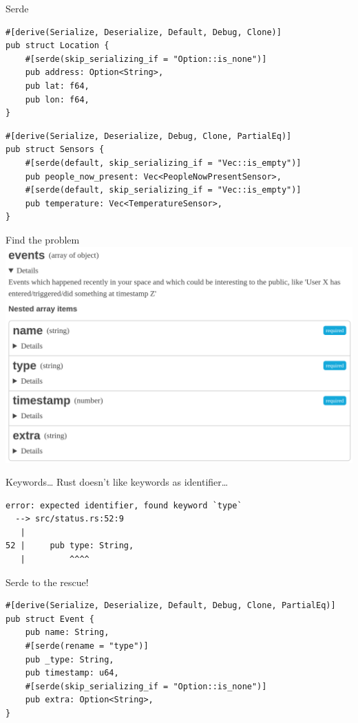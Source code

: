 \begin{frame}[fragile]{Serde}
    \begin{verbatim}
#[derive(Serialize, Deserialize, Default, Debug, Clone)]
pub struct Location {
    #[serde(skip_serializing_if = "Option::is_none")]
    pub address: Option<String>,
    pub lat: f64,
    pub lon: f64,
}
    \end{verbatim}
    \pause\begin{verbatim}
#[derive(Serialize, Deserialize, Debug, Clone, PartialEq)]
pub struct Sensors {
    #[serde(default, skip_serializing_if = "Vec::is_empty")]
    pub people_now_present: Vec<PeopleNowPresentSensor>,
    #[serde(default, skip_serializing_if = "Vec::is_empty")]
    pub temperature: Vec<TemperatureSensor>,
}
    \end{verbatim}
\end{frame}

\begin{frame}[fragile]{Find the problem}
    \includegraphics[height=0.98\textheight]{./spaceapi_in_rust/events.png}
\end{frame}

\begin{frame}[c,fragile]{Keywords\ldots}
    Rust doesn't like keywords as identifier\ldots
    \begin{verbatim}
error: expected identifier, found keyword `type`
  --> src/status.rs:52:9
   |
52 |     pub type: String,
   |         ^^^^
    \end{verbatim}
\end{frame}

\begin{frame}[c,fragile]{Serde to the rescue!}
    \begin{verbatim}
#[derive(Serialize, Deserialize, Default, Debug, Clone, PartialEq)]
pub struct Event {
    pub name: String,
    #[serde(rename = "type")]
    pub _type: String,
    pub timestamp: u64,
    #[serde(skip_serializing_if = "Option::is_none")]
    pub extra: Option<String>,
}
    \end{verbatim}
\end{frame}

